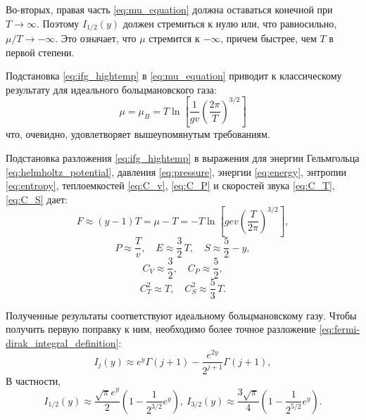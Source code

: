 Во-вторых, правая часть \eqref{eq:mu_equation} должна оставаться конечной при $T \to \infty$.
Поэтому $I _{1 / 2} (y)$ должен стремиться к нулю или, что равносильно, $\mu / T \to -\infty$.
Это означает, что $\mu$ стремится к $-\infty$, причем быстрее, чем $T$ в первой степени.

Подстановка \eqref{eq:ifg_hightemp} в \eqref{eq:mu_equation} приводит к классическому результату для идеального больцмановского газа:
\begin{equation}
    \label{eq:mu_boltzman}
    \mu = \mu_B = T\ln\left[ \frac{1}{gv}\left( \frac{2\pi}{T} \right)^{3/2} \right]
\end{equation}
что, очевидно, удовлетворяет вышеупомянутым требованиям.

Подстановка разложения \eqref{eq:ifg_hightemp} в выражения для энергии Гельмгольца \eqref{eq:helmholtz_potential}, давления \eqref{eq:pressure}, энергии \eqref{eq:energy}, энтропии \eqref{eq:entropy}, теплоемкостей \eqref{eq:C_v}, \eqref{eq:C_P} и скоростей звука \eqref{eq:C_T}, \eqref{eq:C_S} дает:
\begin{equation}
    F\approx (y - 1)T = \mu - T = -T\ln\left[ gev\left( \frac{T}{2\pi} \right)^{3/2} \right],
\end{equation}
\begin{equation}
    P\approx \frac{T}{v},\quad
    E\approx \frac{3}{2}\,T,\quad
    S\approx \frac{5}{2} - y,
\end{equation}
\begin{equation}
    C_{V}\approx \frac{3}{2},\quad
    C_{P}\approx \frac{5}{2},
\end{equation}
\begin{equation}
    C_{T}^2\approx T,\quad
    C_{S}^2\approx \frac{5}{3}\, T.
\end{equation}

Полученные результаты соответствуют идеальному больцмановскому газу. Чтобы получить первую поправку к ним, необходимо более точное разложение \eqref{eq:fermi-dirak_integral_definition}:
\begin{equation}
    \label{eq:ifg_hightemp_precise}
    I_j(y)\approx e^y \Gamma(j + 1) - \frac{e^{2y}}{2^{j+1}}\Gamma(j + 1),
\end{equation}
В частности,
\begin{equation*}
  I_{1/2}(y)\approx \frac{\sqrt{\pi}e^y}{2}\left(
    1 - \frac{1}{2^{3/2}}e^y
  \right),\
  I_{3/2}(y)\approx \frac{3\sqrt{\pi}}{4}\left(
    1 - \frac{1}{2^{5/2}}e^y
  \right).
\end{equation*}

